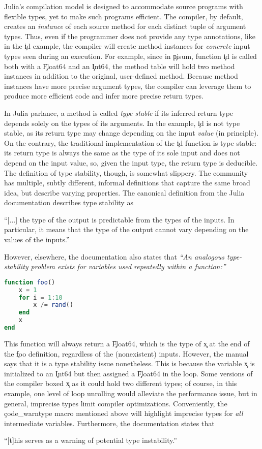 Julia's compilation model is designed to accommodate source programs
with flexible types, yet to make such programs efficient. The compiler, by
default, creates an \emph{instance} of each source method for each distinct tuple of
argument types. Thus, even if the programmer does not provide any type
annotations, like in the \c{id} example, the compiler will create method
instances for \emph{concrete} input types seen during
an execution. For example, since in \c{pisum}, function \c{id} is called both
with a \c{Float64} and an \c{Int64}, the method table will hold two method instances
in addition to the original, user-defined method.
Because method instances have more precise argument types, the compiler can
leverage them to produce more efficient code and infer more precise return types.

In Julia parlance, a method is called \emph{type stable} if its inferred return
type depends solely on the types of its arguments. In the example, \c{id} is not
type stable, as its return type may change depending on the input \emph{value}
(in principle). On the contrary, the traditional implementation of the \c{id}
function is type stable: its return type is always the same as the type of its
sole input and does not depend on the input value, so, given the input type, the
return type is deducible.
The definition of type stability, though, is somewhat slippery.
The community has multiple, subtly different, informal definitions that capture
the same broad idea, but describe varying properties. The canonical definition
from the Julia documentation describes type stability as

\begin{itquote}
  ``[...] the type of the output is predictable from the types of the
  inputs. In particular, it means that the type of the output cannot vary
  depending on the values of the inputs.''
\end{itquote}
However, elsewhere, the documentation also states that \emph{``An analogous
type-stability problem exists for variables used repeatedly within a
function:''}
\begin{lstlisting}[basicstyle=\footnotesize\ttfamily,language=julia]
function foo()
    x = 1
    for i = 1:10
        x /= rand()
    end
    x
end
\end{lstlisting}
This function will always return a \c{Float64}, which is the type of \c{x}
at the end of the \c{foo} definition, regardless of the (nonexistent)
inputs. However, the manual says that it is a type stability issue nonetheless.
This is because the variable \c{x} is initialized to an \c{Int64} but then
assigned a \c{Float64} in the loop. Some versions of the compiler boxed \c{x} as
it could hold two different types; of course, in this example, one level of loop
unrolling would alleviate the performance issue, but in general,
imprecise types limit compiler optimizations.
Conveniently, the \c{code_warntype} macro mentioned above
will highlight imprecise types for \emph{all} intermediate variables.
Furthermore, the documentation states that
\begin{itquote}
  ``[t]his serves as a warning of potential type instability.''
\end{itquote}

